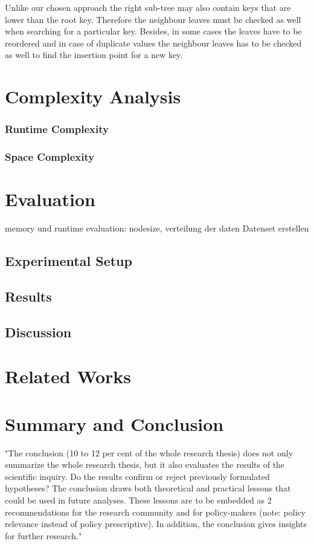 \documentclass[abstracton,12pt]{scrreprt}
\begin{document}
Unlike our chosen approach the right sub-tree may also contain keys that are lower than the root key. Therefore the neighbour leaves must be checked as well when searching for a particular key. Besides, in some cases the leaves have to be reordered and in case of duplicate values the neighbour leaves has to be checked as well to find the insertion point for a new key.




\chapter{Complexity Analysis}
\subsection{Runtime Complexity}
\subsection{Space Complexity}


\chapter{Evaluation}
\label{sec:Experimental}
memory und runtime evaluation: 
nodesize, verteilung der daten 
Datenset erstellen 


\section{Experimental Setup}
\section{Results}
\section{Discussion}


\chapter{Related Works}


\chapter{Summary and Conclusion}
\label{sec:Summary}
"The conclusion (10 to 12 per cent of the whole research thesis) does not only summarize the whole research thesis, but it also evaluates the results of the scientific inquiry. Do the results confirm or reject previously formulated hypotheses? The conclusion draws both theoretical and practical lessons that could be used in future analyses. These lessons are to be embedded as
2
recommendations for the research community and for policy-makers (note: policy relevance instead of policy prescriptive). In addition, the conclusion gives insights for further research."
\end{document}
